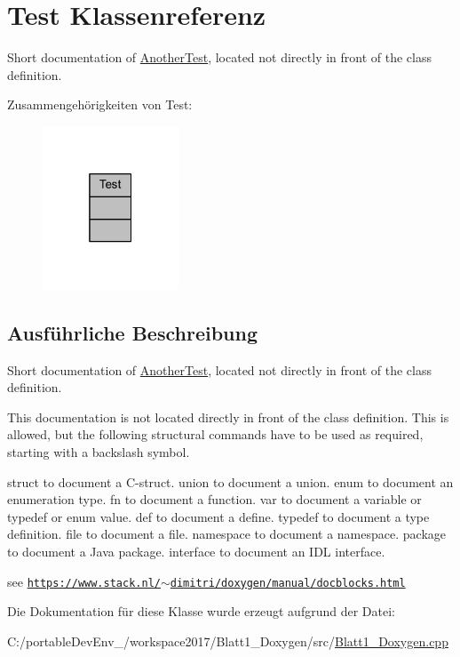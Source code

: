 \hypertarget{class_test}{}\section{Test Klassenreferenz}
\label{class_test}


Short documentation of \hyperlink{class_another_test}{Another\+Test}, located not directly in front of the class definition.  




Zusammengehörigkeiten von Test\+:\nopagebreak
\begin{figure}[H]
\begin{center}
\leavevmode
\includegraphics[width=115pt]{class_test__coll__graph}
\end{center}
\end{figure}


\subsection{Ausführliche Beschreibung}
Short documentation of \hyperlink{class_another_test}{Another\+Test}, located not directly in front of the class definition. 

This documentation is not located directly in front of the class definition. This is allowed, but the following structural commands have to be used as required, starting with a backslash symbol.

struct to document a C-\/struct. union to document a union. enum to document an enumeration type. fn to document a function. var to document a variable or typedef or enum value. def to document a define. typedef to document a type definition. file to document a file. namespace to document a namespace. package to document a Java package. interface to document an I\+DL interface.

see \href{https://www.stack.nl/~dimitri/doxygen/manual/docblocks.html}{\tt https\+://www.\+stack.\+nl/$\sim$dimitri/doxygen/manual/docblocks.\+html} 

Die Dokumentation für diese Klasse wurde erzeugt aufgrund der Datei\+:\begin{DoxyCompactItemize}
\item 
C\+:/portable\+Dev\+Env\+\_/workspace2017/\+Blatt1\+\_\+\+Doxygen/src/\hyperlink{_blatt1___doxygen_8cpp}{Blatt1\+\_\+\+Doxygen.\+cpp}\end{DoxyCompactItemize}
